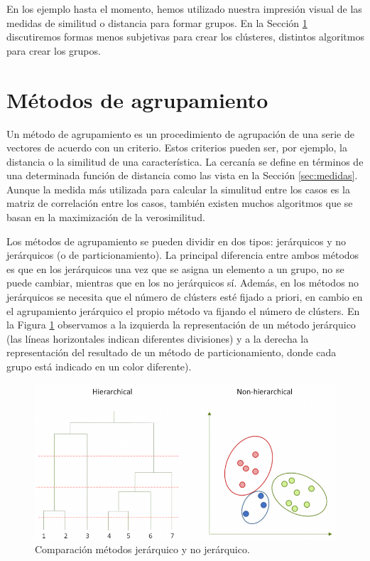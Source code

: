 \documentclass[a4paper, 20pt]{article}
\begin{document}
En los ejemplo hasta el momento, hemos utilizado nuestra impresión visual de las medidas de similitud o distancia para formar grupos. En la Sección \ref{sec:algoritmos} discutiremos formas menos subjetivas para crear los clústeres, distintos algoritmos para crear los grupos. 

\section{Métodos de agrupamiento}\label{sec:algoritmos}
Un método de agrupamiento es un procedimiento de agrupación de una serie de vectores de acuerdo con un criterio. Estos criterios pueden ser, por ejemplo, la distancia o la similitud de una característica. La cercanía se define en términos de una determinada función de distancia como las vista en la Sección \ref{sec:medidas}. Aunque la medida más utilizada para calcular la simulitud entre los casos es la matriz de correlación entre los casos, también existen muchos algoritmos que se basan en la maximización de la verosimilitud.

Los métodos de agrupamiento se pueden dividir en dos tipos: jerárquicos y no jerárquicos (o de particionamiento). La principal diferencia entre ambos métodos es que en los jerárquicos una vez que se asigna un elemento a un grupo, no se puede cambiar, mientras que en los no jerárquicos sí. Además, en los métodos no jerárquicos se necesita que el número de clústers esté fijado a priori, en cambio en el agrupamiento jerárquico el propio método va fijando el número de clústers. En la Figura \ref{fig:ejemplo_metodos} observamos a la izquierda la representación de un método jerárquico (las líneas horizontales indican diferentes divisiones) y a la derecha la representación del resultado de un método de particionamiento, donde cada grupo está indicado en un color diferente).

\begin{figure}[H]
	\centering
	\includegraphics[scale=0.55]{victoria/compJerarquicoNoJerarquico}
	\caption{Comparación métodos jerárquico y no jerárquico.}
	\label{fig:ejemplo_metodos}
\end{figure}
\end{document}
